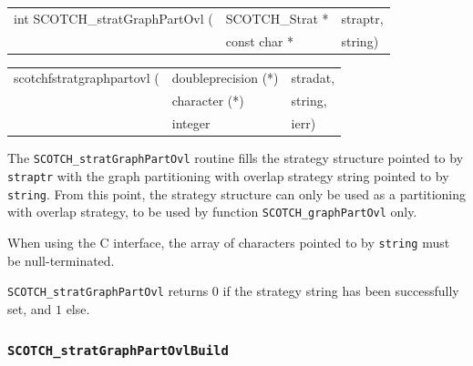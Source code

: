 \begin{itemize}
\progsyn

{\tt\begin{tabular}{l@{}ll}
int SCOTCH\_stratGraphPartOvl ( & SCOTCH\_Strat * & straptr, \\
                                & const char *    & string)
\end{tabular}}

{\tt\begin{tabular}{l@{}ll}
scotchfstratgraphpartovl ( & doubleprecision (*) & stradat, \\
                           & character (*)       & string,  \\
                           & integer             & ierr)
\end{tabular}}

\progdes

The {\tt SCOTCH\_stratGraphPartOvl} routine fills the strategy
structure pointed to by {\tt straptr} with the graph partitioning with
overlap strategy string pointed to by {\tt string}. From this point,
the strategy structure can only be used as a partitioning with overlap
strategy, to be used by function
{\tt SCOTCH\_\lbt graph\lbt Part\lbt Ovl} only.

When using the C interface, the array of characters pointed to by
{\tt string} must be null-terminated.

\progret

{\tt SCOTCH\_stratGraphPartOvl} returns $0$ if the strategy string
has been successfully set, and $1$ else.
\end{itemize}

\subsubsection{{\tt SCOTCH\_stratGraphPartOvlBuild}}
\label{sec-lib-func-stratgraphpartovlbuild}

